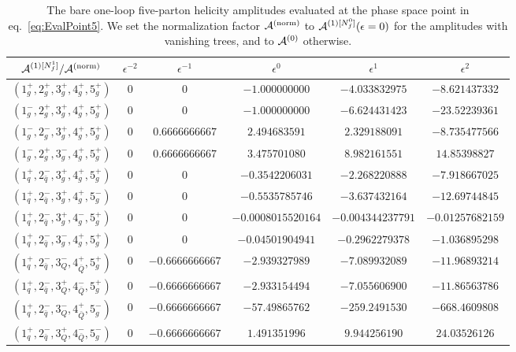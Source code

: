 \begin{table}[h]
\begin{adjustbox}{width=1\textwidth}
\begin{tabular}{cccccc}
      $\mathcal{A}^{(1)[N_f^1]}/\mathcal{A}^\mathrm{(norm)}$   &   $\epsilon^{-2}$   &   $\epsilon^{-1}$   &   $\epsilon^{0}$   &   $\epsilon^{1}$  &  $\epsilon^{2}$ \\
      \midrule
      $(1_g^+,2_g^+,3_g^+,4_g^+,5_g^+)$ & $0$ & $0$ &
      $-1.000000000$ & $-4.033832975$ & $-8.621437332$ \\
      $(1_g^-,2_g^+,3_g^+,4_g^+,5_g^+)$ & $0$ & $0$ &
      $-1.000000000$ & $-6.624431423$ & $-23.52239361$ \\
      $(1_g^-,2_g^-,3_g^+,4_g^+,5_g^+)$ &  $0$ & $0.6666666667$ &
      $2.494683591$ & $2.329188091$ & $-8.735477566$ \\
      $(1_g^-,2_g^+,3_g^-,4_g^+,5_g^+)$ &  $0$ & $0.6666666667$ &
      $3.475701080$ &  $8.982161551$ &  $14.85398827$ \\
      \midrule
      $(1_q^+,2_{\bar q}^-,3_g^+,4_g^+,5_g^+)$ & $0$ & $0$ &
      $-0.3542206031$ & $-2.268220888$ & $-7.918667025$ \\
      $(1_q^+,2_{\bar q}^-,3_g^+,4_g^+,5_g^-)$ & $0$ & $0$ &
      $-0.5535785746$ & $-3.637432164$ & $-12.69744845$ \\
      $(1_q^+,2_{\bar q}^-,3_g^+,4_g^-,5_g^+)$ & $0$ & $0$ &
      $-0.0008015520164$ & $-0.004344237791$ & $-0.01257682159$
      \\
      $(1_q^+,2_{\bar q}^-,3_g^-,4_g^+,5_g^+)$ & $0$ & $0$ &
      $-0.04501904941$ & $-0.2962279378$ & $-1.036895298$ \\
      \midrule
      $(1_q^+,2_{\bar q}^-,3_Q^-,4_{\bar Q}^+,5_g^+)$ & $0$ &
      $-0.6666666667$ & $-2.939327989$ & $-7.089932089$ &
      $-11.96893214$ 
      \\
      $(1_q^+,2_{\bar q}^-,3_Q^+,4_{\bar Q}^-,5_g^+)$ & $0$ &
      $-0.6666666667$ & $-2.933154494$ & $-7.055606900$ &
      $-11.86563786$ 
      \\
      $(1_q^+,2_{\bar q}^-,3_Q^-,4_{\bar Q}^+,5_g^-)$ & $0$ &
      $-0.6666666667$ & $-57.49865762$ & $-259.2491530$ &
      $-668.4609808$
      \\
      $(1_q^+,2_{\bar q}^-,3_Q^+,4_{\bar Q}^-,5_g^-)$ & $0$ &
      $-0.6666666667$ & $1.491351996$ & $9.944256190$ & 
      $24.03526126$ \\
      \bottomrule
    \end{tabular}
  \end{adjustbox}
  \caption{The bare one-loop five-parton helicity amplitudes 
  evaluated at the phase space point in 
  eq.~\eqref{eq:EvalPoint5}. We set the
    normalization factor $\mathcal{A}^\mathrm{(norm)}$ to $\mathcal{A}^{(1)[N_f^0]}(\epsilon=0)$ for the
    amplitudes with vanishing trees, and to $\mathcal{A}^{(0)}$ otherwise.}
  \label{tab:results5parton1L}
\end{table}

